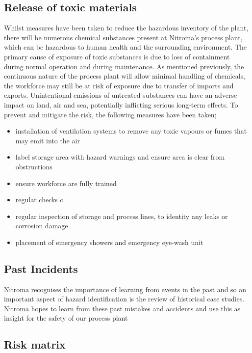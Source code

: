 \subsection{Release of toxic materials}

Whilst measures have been taken to reduce the hazardous inventory of the plant, there will be numerous chemical substances present at Nitroma's process plant, which can be hazardous to human health and the surrounding environment. The primary cause of exposure of toxic substances is due to loss of containment during normal operation and during maintenance. As mentioned previously, the continuous nature of the process plant will allow minimal handling of chemicals, the workforce may still be at risk of exposure due to transfer of imports and exports. Unintentional emissions of untreated substances can have an adverse impact on land, air and sea, potentially inflicting serious long-term effects. To prevent and mitigate the risk, the following measures have been taken;

\begin{itemize}
    \item installation of ventilation systems to remove any toxic vapours or fumes that may emit into the air
    \item label storage area with hazard warnings and ensure area is clear from obstructions 
    \item ensure workforce are fully trained 
    \item regular checks o
    \item regular inspection of storage and process lines, to identity any leaks or corrosion damage 
    \item placement of emergency showers and emergency eye-wash unit
\end{itemize}




\subsection{Past Incidents}

Nitroma recognises the importance of learning from events in the past and so an important aspect of hazard identification is the review of historical case studies. Nitroma hopes to learn from these past mistakes and accidents and use this as insight for the safety of our process plant


\subsection{Risk matrix}

